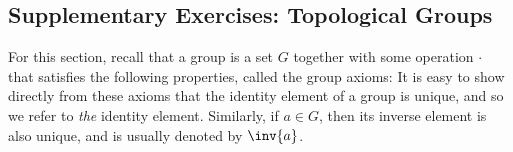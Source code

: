 \renewcommand\thesubsection{TG}
\def\secl{\thesubsection}

\subsection{Supplementary Exercises: Topological Groups}

For this section, recall that a group is a set $G$ together with some operation $\cdot$ that satisfies the following properties, called the group axioms:
It is easy to show directly from these axioms that the identity element of a group is unique, and so we refer to \emph{the} identity element.
Similarly, if $a \in G$, then its inverse element is also unique, and is usually denoted by $\inv{a}$.

